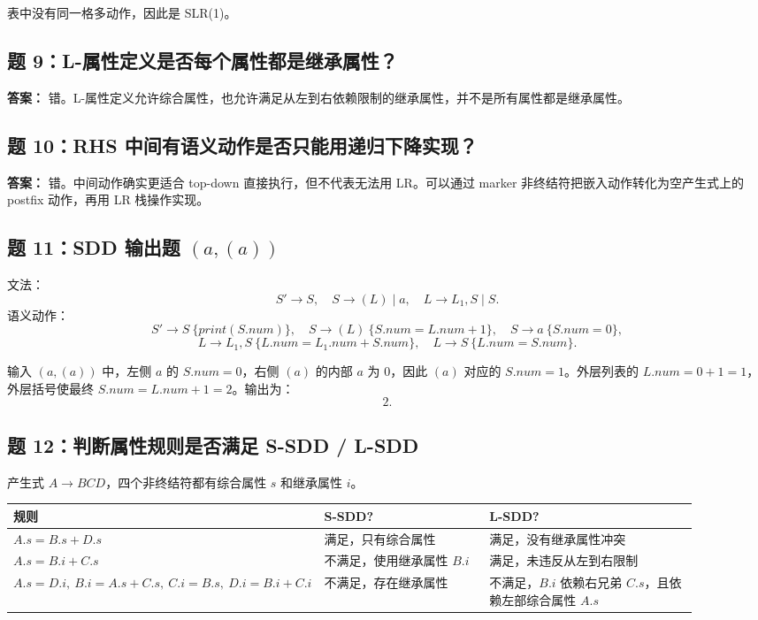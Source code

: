 \documentclass[UTF8,fontset=none,11pt]{ctexart}
\begin{document}
表中没有同一格多动作，因此是 SLR(1)。

\subsection*{题 9：L-属性定义是否每个属性都是继承属性？}

\textbf{答案：} 错。L-属性定义允许综合属性，也允许满足从左到右依赖限制的继承属性，并不是所有属性都是继承属性。

\subsection*{题 10：RHS 中间有语义动作是否只能用递归下降实现？}

\textbf{答案：} 错。中间动作确实更适合 top-down 直接执行，但不代表无法用 LR。可以通过 marker 非终结符把嵌入动作转化为空产生式上的 postfix 动作，再用 LR 栈操作实现。

\subsection*{题 11：SDD 输出题 \texorpdfstring{\((a,(a))\)}{(a,(a))}}

文法：
\[
S'\to S,\quad S\to (L)\mid a,\quad L\to L_1,S\mid S.
\]
语义动作：
\[
S'\to S\ \{print(S.num)\},\quad
S\to (L)\ \{S.num=L.num+1\},\quad
S\to a\ \{S.num=0\},
\]
\[
L\to L_1,S\ \{L.num=L_1.num+S.num\},\quad
L\to S\ \{L.num=S.num\}.
\]

输入 \((a,(a))\) 中，左侧 \(a\) 的 \(S.num=0\)，右侧 \((a)\) 的内部 \(a\) 为 0，因此 \((a)\) 对应的 \(S.num=1\)。外层列表的 \(L.num=0+1=1\)，外层括号使最终 \(S.num=L.num+1=2\)。输出为：
\[
2.
\]

\subsection*{题 12：判断属性规则是否满足 S-SDD / L-SDD}

产生式 \(A\to BCD\)，四个非终结符都有综合属性 \(s\) 和继承属性 \(i\)。

\begin{longtable}{L{0.31\linewidth}L{0.26\linewidth}L{0.33\linewidth}}
\toprule
规则 & S-SDD? & L-SDD? \\
\midrule
\(A.s=B.s+D.s\) & 满足，只有综合属性 & 满足，没有继承属性冲突 \\
\(A.s=B.i+C.s\) & 不满足，使用继承属性 \(B.i\) & 满足，未违反从左到右限制 \\
\(A.s=D.i,\ B.i=A.s+C.s,\ C.i=B.s,\ D.i=B.i+C.i\) & 不满足，存在继承属性 & 不满足，\(B.i\) 依赖右兄弟 \(C.s\)，且依赖左部综合属性 \(A.s\) \\
\bottomrule
\end{longtable}
\end{document}
